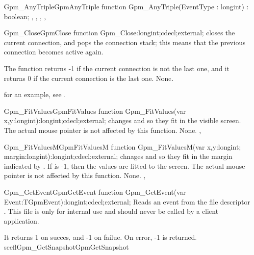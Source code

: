 \begin{functionl}{Gpm\_AnyTriple}{GpmAnyTriple}
\Declaration
function Gpm\_AnyTriple(EventType : longint) : boolean;
\Description
\Errors
\SeeAlso
{},
,
,
,
\end{functionl}

\begin{functionl}{Gpm\_Close}{GpmClose}
\Declaration
function Gpm\_Close:longint;cdecl;external;
\Description
{} closes the current connection, and pops the connection
stack; this means that the previous connection becomes active again.

The function returns -1 if the current connection is not the last one,
and it returns 0 if the current connection is the last one.
\Errors
None.
\SeeAlso
{}
\end{functionl}

for an example, see .

\begin{functionl}{Gpm\_FitValues}{GpmFitValues}
\Declaration
function Gpm\_FitValues(var x,y:longint):longint;cdecl;external;
\Description
{} changes  and  so they fit in the visible
screen. The actual mouse pointer is not affected by this function.
\Errors
None.
\SeeAlso
{},
\end{functionl}

\begin{functionl}{Gpm\_FitValuesM}{GpmFitValuesM}
\Declaration
function Gpm\_FitValuesM(var x,y:longint; margin:longint):longint;cdecl;external;
\Description
{} chnages  and  so they fit in the margin
indicated by . If  is -1, then the values are fitted
to the screen. The actual mouse pointer is not affected by this function.
\Errors
None.
\SeeAlso
{},
\end{functionl}

\begin{functionl}{Gpm\_GetEvent}{GpmGetEvent}
\Declaration
function Gpm\_GetEvent(var Event:TGpmEvent):longint;cdecl;external;
\Description
{} Reads an event from the file descriptor .
This file is only for internal use and should never be called by a client
application. 

It returns 1 on succes, and -1 on failue.
\Errors
On error, -1 is returned. 
\SeeAlso
seefl{Gpm\_GetSnapshot}{GpmGetSnapshot}
\end{functionl}

